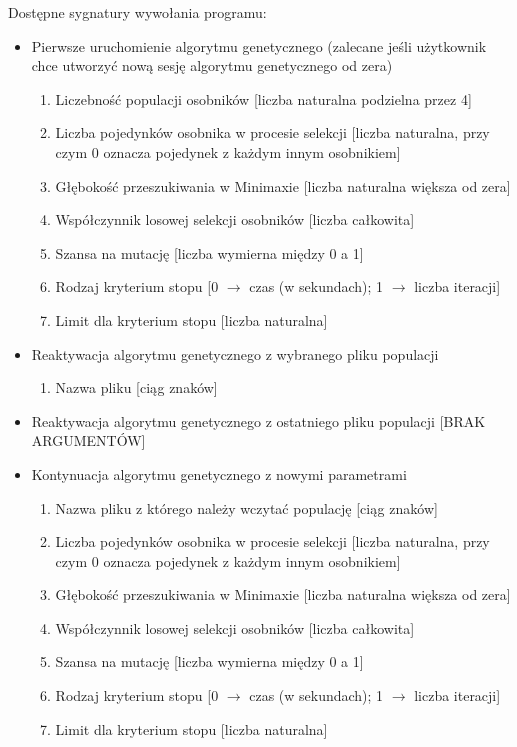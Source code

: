 Dostępne sygnatury wywołania programu:
\begin{itemize}
    \item Pierwsze uruchomienie algorytmu genetycznego (zalecane jeśli użytkownik chce utworzyć nową sesję algorytmu genetycznego od zera)
    \begin{enumerate}
        \item Liczebność populacji osobników [liczba naturalna podzielna przez 4]
        \item Liczba pojedynków osobnika w procesie selekcji [liczba naturalna, przy czym 0 oznacza pojedynek z każdym innym osobnikiem]
        \item Głębokość przeszukiwania w Minimaxie [liczba naturalna większa od zera]
        \item Współczynnik losowej selekcji osobników [liczba całkowita]
        \item Szansa na mutację [liczba wymierna między 0 a 1]
        \item Rodzaj kryterium stopu [0 $\rightarrow$ czas (w sekundach); 1 $\rightarrow$ liczba iteracji]
        \item Limit dla kryterium stopu [liczba naturalna]
    \end{enumerate}
    \item Reaktywacja algorytmu genetycznego z wybranego pliku populacji
    \begin{enumerate}
        \item Nazwa pliku [ciąg znaków]
    \end{enumerate}
    \item Reaktywacja algorytmu genetycznego z ostatniego pliku populacji [BRAK ARGUMENTÓW]
    \item Kontynuacja algorytmu genetycznego z nowymi parametrami
    \begin{enumerate}
        \item Nazwa pliku z którego należy wczytać populację [ciąg znaków]
        \item Liczba pojedynków osobnika w procesie selekcji [liczba naturalna, przy czym 0 oznacza pojedynek z każdym innym osobnikiem]
        \item Głębokość przeszukiwania w Minimaxie [liczba naturalna większa od zera]
        \item Współczynnik losowej selekcji osobników [liczba całkowita]
        \item Szansa na mutację [liczba wymierna między 0 a 1]
        \item Rodzaj kryterium stopu [0 $\rightarrow$ czas (w sekundach); 1 $\rightarrow$ liczba iteracji]
        \item Limit dla kryterium stopu [liczba naturalna]
    \end{enumerate}
\end{itemize}

